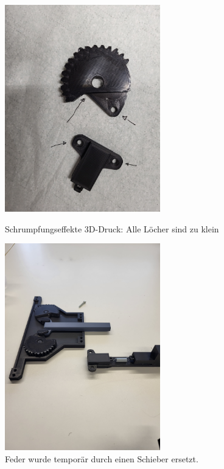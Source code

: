 \documentclass[../main.tex]{subfiles}
\begin{document}
\begin{figure}[h!]
    \centering
    \begin{minipage}[t]{0.45\textwidth}
        \centering
        \includegraphics[height=9cm]{img/greifarmtest/prototyp_test_loecher.jpeg}
        \caption{Schrumpfungseffekte 3D-Druck: Alle Löcher sind zu klein}
        \label{fig:hardware_test_loecher}
    \end{minipage}%
    \hfill
    \begin{minipage}[t]{0.45\textwidth}
        \centering
        \includegraphics[height=9cm]{img/greifarmtest/prototyp_test_schieber.jpeg}
        \caption{Feder wurde temporär durch einen Schieber ersetzt.}
        \label{fig:hardware_test_schieber}
    \end{minipage}
\end{figure}
\newpage
\end{document}
